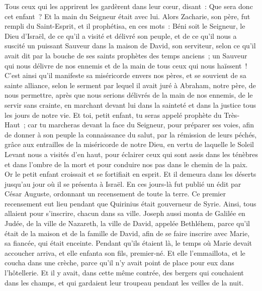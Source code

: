 \begin{multicols}{2}
Tous ceux qui les apprirent les gardèrent dans leur cœur, disant~: Que sera donc cet enfant~? Et la main du Seigneur était avec lui.
Alors Zacharie, son père, fut rempli du Saint-Esprit, et il prophétisa, en ces mots~:
Béni soit le Seigneur, le Dieu d'Israël, de ce qu'il a visité et délivré son peuple,
et de ce qu'il nous a suscité un puissant Sauveur dans la maison de David, son serviteur,
selon ce qu'il avait dit par la bouche de ses saints prophètes des temps anciens~;
un Sauveur qui nous délivre de nos ennemis et de la main de tous ceux qui nous haïssent~!
C'est ainsi qu'il manifeste sa miséricorde envers nos pères, et se souvient de sa sainte alliance,
selon le serment par lequel il avait juré à Abraham, notre père,
de nous permettre, après que nous serions délivrés de la main de nos ennemis, de le servir sans crainte,
en marchant devant lui dans la sainteté et dans la justice tous les jours de notre vie.
Et toi, petit enfant, tu seras appelé prophète du Très-Haut~; car tu marcheras devant la face du Seigneur, pour préparer ses voies,
afin de donner à son peuple la connaissance du salut, par la rémission de leurs péchés,
grâce aux entrailles de la miséricorde de notre Dieu, en vertu de laquelle le Soleil Levant nous a visités d'en haut,
pour éclairer ceux qui sont assis dans les ténèbres et dans l'ombre de la mort et pour conduire nos pas dans le chemin de la paix.
Or le petit enfant croissait et se fortifiait en esprit. Et il demeura dans les déserts jusqu'au jour où il se présenta à Israël.
\VerseOne{}En ces jours-là fut publié un édit par César Auguste, ordonnant un recensement de toute la terre.
Ce premier recensement eut lieu pendant que Quirinius était gouverneur de Syrie.
Ainsi, tous allaient pour s'inscrire, chacun dans sa ville.
Joseph aussi monta de Galilée en Judée, de la ville de Nazareth, la ville de David, appelée Bethléhem, parce qu'il était de la maison et de la famille de David,
afin de se faire inscrire avec Marie, sa fiancée, qui était enceinte.
Pendant qu'ils étaient là, le temps où Marie devait accoucher arriva,
et elle enfanta son fils, premier-né. Et elle l'emmaillota, et le coucha dans une crèche, parce qu'il n'y avait point de place pour eux dans l'hôtellerie.
Et il y avait, dans cette même contrée, des bergers qui couchaient dans les champs, et qui gardaient leur troupeau pendant les veilles de la nuit.

\end{multicols}
